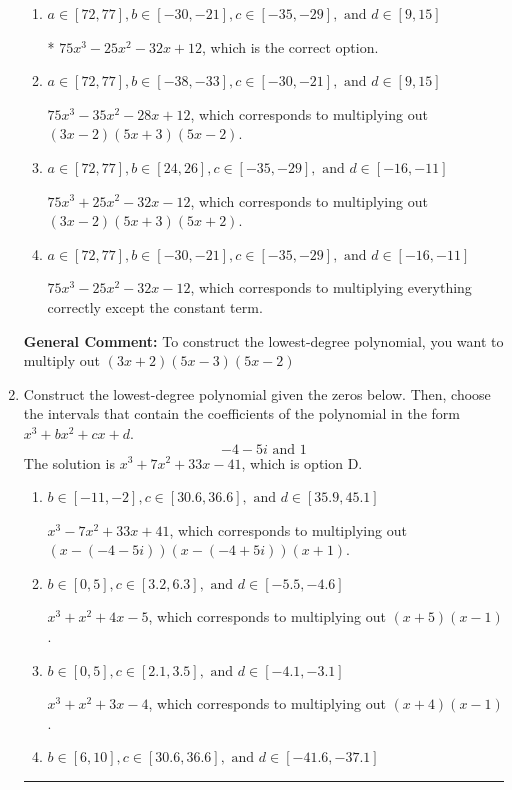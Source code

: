 \documentclass{extbook}[14pt]
\newcommand{\litem}[1]{\item #1

\rule{\textwidth}{0.4pt}}
\begin{document}
\begin{enumerate}
{\begin{enumerate}[label=\Alph*.]
$75x^{3} -125 x^{2} +68 x -12$, which corresponds to multiplying out $(3x -2)(5x -3)(5x -2)$.
\item \( a \in [72, 77], b \in [-30, -21], c \in [-35, -29], \text{ and } d \in [9, 15] \)

* $75x^{3} -25 x^{2} -32 x + 12$, which is the correct option.
\item \( a \in [72, 77], b \in [-38, -33], c \in [-30, -21], \text{ and } d \in [9, 15] \)

$75x^{3} -35 x^{2} -28 x + 12$, which corresponds to multiplying out $(3x -2)(5x + 3)(5x -2)$.
\item \( a \in [72, 77], b \in [24, 26], c \in [-35, -29], \text{ and } d \in [-16, -11] \)

$75x^{3} +25 x^{2} -32 x -12$, which corresponds to multiplying out $(3x -2)(5x + 3)(5x + 2)$.
\item \( a \in [72, 77], b \in [-30, -21], c \in [-35, -29], \text{ and } d \in [-16, -11] \)

$75x^{3} -25 x^{2} -32 x -12$, which corresponds to multiplying everything correctly except the constant term.
\end{enumerate}

\textbf{General Comment:} To construct the lowest-degree polynomial, you want to multiply out $(3x + 2)(5x -3)(5x -2)$
}
\litem{
Construct the lowest-degree polynomial given the zeros below. Then, choose the intervals that contain the coefficients of the polynomial in the form $x^3+bx^2+cx+d$.
\[ -4 - 5 i \text{ and } 1 \]The solution is \( x^{3} +7 x^{2} +33 x -41 \), which is option D.\begin{enumerate}[label=\Alph*.]
\item \( b \in [-11, -2], c \in [30.6, 36.6], \text{ and } d \in [35.9, 45.1] \)

$x^{3} -7 x^{2} +33 x + 41$, which corresponds to multiplying out $(x-(-4 - 5 i))(x-(-4 + 5 i))(x + 1)$.
\item \( b \in [0, 5], c \in [3.2, 6.3], \text{ and } d \in [-5.5, -4.6] \)

$x^{3} + x^{2} +4 x -5$, which corresponds to multiplying out $(x + 5)(x -1)$.
\item \( b \in [0, 5], c \in [2.1, 3.5], \text{ and } d \in [-4.1, -3.1] \)

$x^{3} + x^{2} +3 x -4$, which corresponds to multiplying out $(x + 4)(x -1)$.
\item \( b \in [6, 10], c \in [30.6, 36.6], \text{ and } d \in [-41.6, -37.1] \)


\end{enumerate}}
\end{enumerate}
\end{document}
